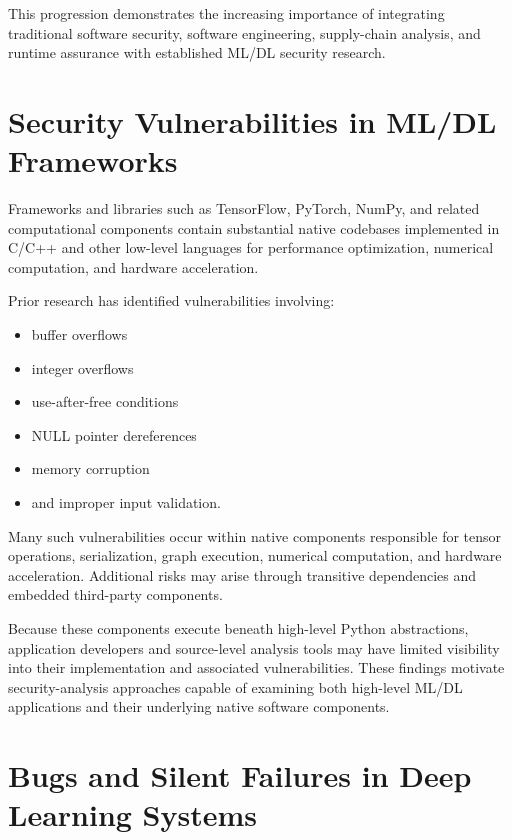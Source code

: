 \documentclass[
  12pt,
  letterpaper,
  oneside]{report}
\providecommand{\tightlist}{%
  \setlength{\itemsep}{0pt}\setlength{\parskip}{0pt}}
\begin{document}
This progression demonstrates the increasing importance of integrating
traditional software security, software engineering, supply-chain
analysis, and runtime assurance with established ML/DL security
research.\cite{xiao2018security,meiklejohn2025modelsupplychain,lai2025security,tan2026securing}

\section{Security Vulnerabilities in ML/DL Frameworks}\label{812-security-vulnerabilities-in-mldl-frameworks}

Frameworks and libraries such as TensorFlow, PyTorch, NumPy, and related
computational components contain substantial native codebases
implemented in C/C++ and other low-level languages for performance
optimization, numerical computation, and hardware acceleration.

Prior research has identified vulnerabilities involving:

\begin{itemize}
\tightlist
\item
  buffer overflows
\item
  integer overflows
\item
  use-after-free conditions
\item
  NULL pointer dereferences
\item
  memory corruption
\item
  and improper input validation.
\end{itemize}

Many such vulnerabilities occur within native components responsible for
tensor operations, serialization, graph execution, numerical
computation, and hardware acceleration. Additional risks may arise
through transitive dependencies and embedded third-party components.

Because these components execute beneath high-level Python abstractions,
application developers and source-level analysis tools may have limited
visibility into their implementation and associated vulnerabilities.
These findings motivate security-analysis approaches capable of
examining both high-level ML/DL applications and their underlying native
software components.\cite{xiao2018security,filus2023software,lai2025security,zhou2025unraveling}

\section{Bugs and Silent Failures in Deep Learning Systems}\label{813-bugs-and-silent-failures-in-deep-learning-systems}
\end{document}
